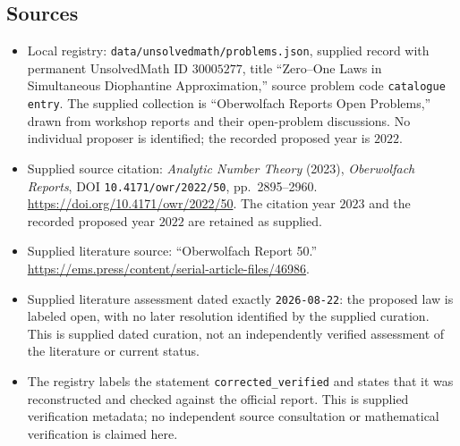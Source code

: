 \documentclass[11pt]{article}
\begin{document}
\subsection{Sources}
\begin{itemize}
\item Local registry: \texttt{data/unsolvedmath/problems.json}, supplied record with permanent UnsolvedMath ID \(30005277\), title ``Zero--One Laws in Simultaneous Diophantine Approximation,'' source problem code \texttt{catalogue entry}. The supplied collection is ``Oberwolfach Reports Open Problems,'' drawn from workshop reports and their open-problem discussions. No individual proposer is identified; the recorded proposed year is \(2022\).
\item Supplied source citation: \emph{Analytic Number Theory} (2023), \emph{Oberwolfach Reports}, DOI \texttt{10.4171/owr/2022/50}, pp.\ 2895--2960. \url{https://doi.org/10.4171/owr/2022/50}. The citation year \(2023\) and the recorded proposed year \(2022\) are retained as supplied.
\item Supplied literature source: ``Oberwolfach Report 50.'' \url{https://ems.press/content/serial-article-files/46986}.
\item Supplied literature assessment dated exactly \texttt{2026-08-22}: the proposed law is labeled open, with no later resolution identified by the supplied curation. This is supplied dated curation, not an independently verified assessment of the literature or current status.
\item The registry labels the statement \texttt{corrected\_verified} and states that it was reconstructed and checked against the official report. This is supplied verification metadata; no independent source consultation or mathematical verification is claimed here.
\end{itemize}
\end{document}
